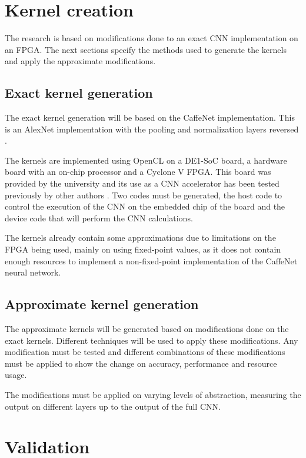 \section{Kernel creation}

The research is based on modifications done to an exact CNN implementation on an FPGA. 
The next sections specify the methods used to generate the kernels and apply the 
approximate modifications.

\subsection{Exact kernel generation}

The exact kernel generation will be based on the CaffeNet implementation. This is an AlexNet implementation
with the pooling and normalization layers reversed \cite{donahue2012bvlc}. 

The kernels are implemented using OpenCL on a DE1-SoC board, a hardware board with an on-chip processor and
a Cyclone V FPGA. This board was provided by the university and its use as a CNN accelerator has been tested
previously by other authors \cite{suda}\cite{pipecnn}.
Two codes must be generated, the host code to control the execution of the CNN on
the embedded chip of the board and the device code that will perform the CNN calculations.

The kernels already contain some approximations due to limitations on the FPGA being used, mainly on using
fixed-point values, as it does
not contain enough resources to implement a non-fixed-point implementation of the CaffeNet neural network.

\subsection{Approximate kernel generation}

The approximate kernels will be generated based on modifications done on the exact kernels.
Different techniques will be used to apply these modifications. Any modification must be tested
and different combinations of these modifications must be applied to show the change on accuracy,
performance and resource usage.

The modifications must be applied on varying levels of abstraction, measuring the output on different
layers up to the output of the full CNN.

\section{Validation}

